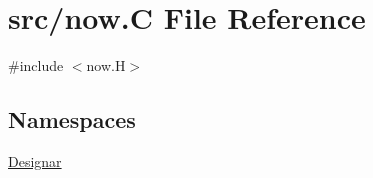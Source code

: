 \hypertarget{now_8_c}{}\section{src/now.C File Reference}
\label{now_8_c}
{\ttfamily \#include $<$now.\+H$>$}\newline
\subsection*{Namespaces}
\begin{DoxyCompactItemize}
\item 
 \hyperlink{namespace_designar}{Designar}
\end{DoxyCompactItemize}
